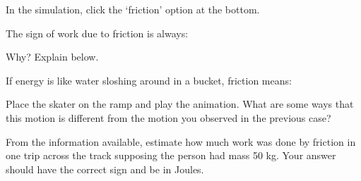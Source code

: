 \documentclass{handout}
\begin{document}
In the simulation, click the `friction' option at the bottom.
\begin{questions}
    \question The sign of work due to friction is always:
    Why? Explain below.

    \answerspace{1in}

    \question If energy is like water sloshing around in a bucket, friction means:

    \question Place the skater on the ramp and play the animation. What are some ways that this motion is different from the motion you observed in the previous case?

    \answerspace{1in}

    \question From the information available, estimate how much work was done by friction in one trip across the track supposing the person had mass 50 kg. Your answer should have the correct sign and be in Joules.

    \answerspace{1in}
\end{questions}
\end{document}
